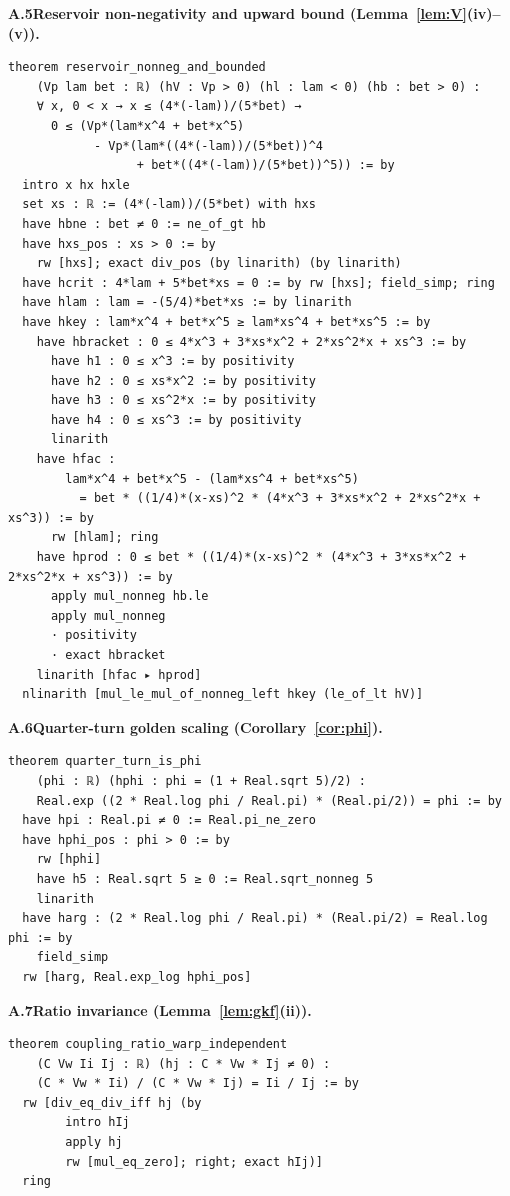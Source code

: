 \medskip \noindent\textbf{A.5\quad Reservoir non-negativity and upward bound (Lemma~\ref{lem:V}(iv)--(v)).}
\begin{verbatim}
theorem reservoir_nonneg_and_bounded
    (Vp lam bet : ℝ) (hV : Vp > 0) (hl : lam < 0) (hb : bet > 0) :
    ∀ x, 0 < x → x ≤ (4*(-lam))/(5*bet) →
      0 ≤ (Vp*(lam*x^4 + bet*x^5)
            - Vp*(lam*((4*(-lam))/(5*bet))^4
                  + bet*((4*(-lam))/(5*bet))^5)) := by
  intro x hx hxle
  set xs : ℝ := (4*(-lam))/(5*bet) with hxs
  have hbne : bet ≠ 0 := ne_of_gt hb
  have hxs_pos : xs > 0 := by
    rw [hxs]; exact div_pos (by linarith) (by linarith)
  have hcrit : 4*lam + 5*bet*xs = 0 := by rw [hxs]; field_simp; ring
  have hlam : lam = -(5/4)*bet*xs := by linarith
  have hkey : lam*x^4 + bet*x^5 ≥ lam*xs^4 + bet*xs^5 := by
    have hbracket : 0 ≤ 4*x^3 + 3*xs*x^2 + 2*xs^2*x + xs^3 := by
      have h1 : 0 ≤ x^3 := by positivity
      have h2 : 0 ≤ xs*x^2 := by positivity
      have h3 : 0 ≤ xs^2*x := by positivity
      have h4 : 0 ≤ xs^3 := by positivity
      linarith
    have hfac :
        lam*x^4 + bet*x^5 - (lam*xs^4 + bet*xs^5)
          = bet * ((1/4)*(x-xs)^2 * (4*x^3 + 3*xs*x^2 + 2*xs^2*x + xs^3)) := by
      rw [hlam]; ring
    have hprod : 0 ≤ bet * ((1/4)*(x-xs)^2 * (4*x^3 + 3*xs*x^2 + 2*xs^2*x + xs^3)) := by
      apply mul_nonneg hb.le
      apply mul_nonneg
      · positivity
      · exact hbracket
    linarith [hfac ▸ hprod]
  nlinarith [mul_le_mul_of_nonneg_left hkey (le_of_lt hV)]
\end{verbatim}

\medskip \noindent\textbf{A.6\quad Quarter-turn golden scaling (Corollary~\ref{cor:phi}).}
\begin{verbatim}
theorem quarter_turn_is_phi
    (phi : ℝ) (hphi : phi = (1 + Real.sqrt 5)/2) :
    Real.exp ((2 * Real.log phi / Real.pi) * (Real.pi/2)) = phi := by
  have hpi : Real.pi ≠ 0 := Real.pi_ne_zero
  have hphi_pos : phi > 0 := by
    rw [hphi]
    have h5 : Real.sqrt 5 ≥ 0 := Real.sqrt_nonneg 5
    linarith
  have harg : (2 * Real.log phi / Real.pi) * (Real.pi/2) = Real.log phi := by
    field_simp
  rw [harg, Real.exp_log hphi_pos]
\end{verbatim}

\medskip \noindent\textbf{A.7\quad Ratio invariance (Lemma~\ref{lem:gkf}(ii)).}
\begin{verbatim}
theorem coupling_ratio_warp_independent
    (C Vw Ii Ij : ℝ) (hj : C * Vw * Ij ≠ 0) :
    (C * Vw * Ii) / (C * Vw * Ij) = Ii / Ij := by
  rw [div_eq_div_iff hj (by
        intro hIj
        apply hj
        rw [mul_eq_zero]; right; exact hIj)]
  ring
\end{verbatim}

